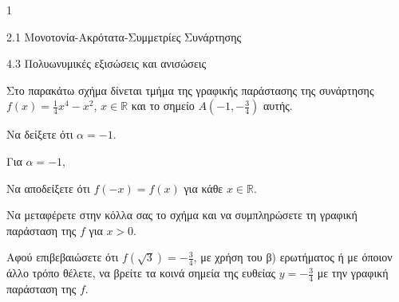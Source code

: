 \begin{ylh}{1}
\item 2.1 Μονοτονία-Ακρότατα-Συμμετρίες Συνάρτησης
\item 4.3 Πολυωνυμικές εξισώσεις και ανισώσεις
\end{ylh}
Στο παρακάτω σχήμα δίνεται τμήμα της γραφικής παράστασης της συνάρτησης $f(x) = \frac{1}{4}x^4 - x^2$, $x \in \mathbb{R}$ και το σημείο $A\left(-1, -\frac{3}{4}\right)$ αυτής.
\begin{center}
\end{center}
\begin{alist}
\item Να δείξετε ότι $\alpha = -1$. 
\item Για $\alpha = -1$,
\begin{rlist}
\item Να αποδείξετε ότι $f(-x) = f(x)$ για κάθε $x \in \mathbb{R}$. 
\item Να μεταφέρετε στην κόλλα σας το σχήμα και να συμπληρώσετε τη γραφική παράσταση της $f$ για $x > 0$. 
\end{rlist}
\item Αφού επιβεβαιώσετε ότι $f(\sqrt{3}) = -\frac{3}{4}$, με χρήση του β) ερωτήματος ή με όποιον άλλο τρόπο θέλετε, να βρείτε τα κοινά σημεία της ευθείας $y = -\frac{3}{4}$ με την γραφική παράσταση της $f$. 
\end{alist}

